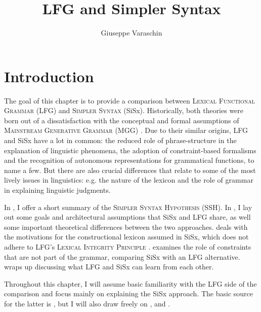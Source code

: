\documentclass[output=paper,hidelinks]{langscibook}
\title{LFG and Simpler Syntax}
\author{Giuseppe Varaschin\affiliation{Humboldt-Universität zu Berlin}}
\begin{document}
\maketitle
\label{ss:chap:SimplerSyntax}

\section{Introduction} 

The goal of this chapter is to provide a comparison between \textsc{Lexical Functional Grammar} (LFG) and \textsc{Simpler Syntax} (SiSx). Historically, both theories were born out of a dissatisfaction with the conceptual and formal assumptions of \textsc{Mainstream Generative Grammar} (MGG) \citep{chomsky1957syntactic, chomsky1965aspects, chomsky1981lectures, chomsky1995the-minimalist}. Due to their similar origins, LFG and SiSx have a lot in common: the reduced role of phrase-structure in the explanation of linguistic phenomena, the adoption of constraint-based formalisms and the recognition of autonomous representations for grammatical functions, to name a few. But there are also crucial differences that relate to some of the most lively issues in linguistics: e.g. the nature of the lexicon and the role of grammar in explaining linguistic judgments. %

In , I offer a short summary of the \textsc{Simpler Syntax Hypothesis} (SSH). In , I lay out some goals and architectural assumptions that SiSx and LFG share, as well some important theoretical differences between the two approaches.  deals with the motivations for the constructional lexicon assumed in SiSx, which does not adhere to LFG's \textsc{Lexical Integrity Principle} \citep{bresnan1995the-lexical}.  examines the role of constraints that are not part of the grammar, comparing SiSx with an LFG alternative.  wraps up discussing what LFG and SiSx can learn from each other.  

Throughout this chapter, I will assume basic familiarity with the LFG side of the comparison and focus mainly on explaining the SiSx approach. The basic source for the latter is \citet{culicover2005simpler}, but I will also draw freely on \citet{jackendoff2002foundations, jackendoff2010meaning}, \citet{jackendoff2020texture} and  \citet{culicover2009natural, culicover2013grammar, culicover2019origin}.
\end{document}
